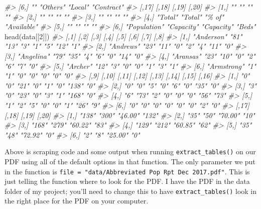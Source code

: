 \documentclass[
]{krantz}
\makeatletter
\newenvironment{Shaded}{\begin{snugshade}}{\end{snugshade}}
\newcommand{\CommentTok}[1]{\textcolor[rgb]{0.37,0.37,0.37}{\textit{#1}}}
\newcommand{\DecValTok}[1]{\textcolor[rgb]{0.06,0.06,0.06}{#1}}
\newcommand{\FunctionTok}[1]{\textcolor[rgb]{0,0,0}{#1}}
\newcommand{\NormalTok}[1]{#1}
\newenvironment{kframe}{%
\medskip{}
\setlength{\fboxsep}{.8em}
 \def\at@end@of@kframe{}%
 \ifinner\ifhmode%
  \def\at@end@of@kframe{\end{minipage}}%
  \begin{minipage}{\columnwidth}%
 \fi\fi%
 \def\FrameCommand##1{\hskip\@totalleftmargin \hskip-\fboxsep
 \colorbox{shadecolor}{##1}\hskip-\fboxsep
     \hskip-\linewidth \hskip-\@totalleftmargin \hskip\columnwidth}%
 \MakeFramed {\advance\hsize-\width
   \@totalleftmargin\z@ \linewidth\hsize
   \@setminipage}}%
 {\par\unskip\endMakeFramed%
 \at@end@of@kframe}
\renewenvironment{Shaded}{\begin{kframe}}{\end{kframe}}
\makeatother
\begin{document}
\begin{Shaded}
\begin{Highlighting}[]
\CommentTok{\#\textgreater{} [6,] ""              "Others" "Local" "Contract"}
\CommentTok{\#\textgreater{}      [,17]        [,18]      [,19]      [,20]      }
\CommentTok{\#\textgreater{} [1,] ""           ""         ""         ""         }
\CommentTok{\#\textgreater{} [2,] ""           ""         ""         ""         }
\CommentTok{\#\textgreater{} [3,] ""           ""         ""         ""         }
\CommentTok{\#\textgreater{} [4,] "Total"      "Total"    "\% of"     "Available"}
\CommentTok{\#\textgreater{} [5,] ""           ""         ""         ""         }
\CommentTok{\#\textgreater{} [6,] "Population" "Capacity" "Capacity" "Beds"}
\FunctionTok{head}\NormalTok{(data[[}\DecValTok{2}\NormalTok{]])}
\CommentTok{\#\textgreater{}      [,1]        [,2] [,3] [,4] [,5] [,6] [,7] [,8]}
\CommentTok{\#\textgreater{} [1,] "Anderson"  "81" "13" "3"  "1"  "5"  "12" "1" }
\CommentTok{\#\textgreater{} [2,] "Andrews"   "23" "11" "0"  "2"  "4"  "11" "0" }
\CommentTok{\#\textgreater{} [3,] "Angelina"  "79" "35" "4"  "6"  "0"  "14" "0" }
\CommentTok{\#\textgreater{} [4,] "Aransas"   "23" "10" "0"  "2"  "6"  "7"  "0" }
\CommentTok{\#\textgreater{} [5,] "Archer"    "12" "3"  "0"  "0"  "1"  "3"  "1" }
\CommentTok{\#\textgreater{} [6,] "Armstrong" "1"  "1"  "0"  "0"  "0"  "0"  "0" }
\CommentTok{\#\textgreater{}      [,9] [,10] [,11] [,12] [,13] [,14] [,15] [,16]}
\CommentTok{\#\textgreater{} [1,] "0"  "0"   "21"  "0"   "1"   "0"   "138" "0"  }
\CommentTok{\#\textgreater{} [2,] "0"  "0"   "5"   "0"   "6"   "0"   "35"  "0"  }
\CommentTok{\#\textgreater{} [3,] "3"  "0"   "23"  "0"   "3"   "1"   "168" "0"  }
\CommentTok{\#\textgreater{} [4,] "6"  "73"  "2"   "0"   "0"   "0"   "56"  "73" }
\CommentTok{\#\textgreater{} [5,] "1"  "2"   "5"   "0"   "0"   "1"   "26"  "9"  }
\CommentTok{\#\textgreater{} [6,] "0"  "0"   "0"   "0"   "0"   "0"   "2"   "0"  }
\CommentTok{\#\textgreater{}      [,17] [,18] [,19]   [,20]}
\CommentTok{\#\textgreater{} [1,] "138" "300" "46.00" "132"}
\CommentTok{\#\textgreater{} [2,] "35"  "50"  "70.00" "10" }
\CommentTok{\#\textgreater{} [3,] "168" "279" "60.22" "83" }
\CommentTok{\#\textgreater{} [4,] "129" "212" "60.85" "62" }
\CommentTok{\#\textgreater{} [5,] "35"  "48"  "72.92" "0"  }
\CommentTok{\#\textgreater{} [6,] "2"   "8"   "25.00" "0"}
\end{Highlighting}
\end{Shaded}

Above is scraping code and some output when running \texttt{extract\_tables()} on our PDF using all of the default options in that function. The only parameter we put in the function is \texttt{file\ =\ "data/Abbreviated\ Pop\ Rpt\ Dec\ 2017.pdf"}. This is just telling the function where to look for the PDF. I have the PDF in the data folder of my project; you'll need to change this to have \texttt{extract\_tables()} look in the right place for the PDF on your computer.
\end{document}
